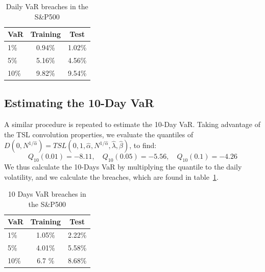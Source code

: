 \documentclass[11pt]{article}
\begin{document}
        \begin{table}[h!]
            \centering
            \begin{tabular}{l|cc}
                  \textbf{VaR}   & \textbf{Training} & \textbf{Test} \\
                  \hline
                  1\%   & 0.94\% & 1.02\% \\
                  5\%   & 5.16\% & 4.56\% \\
                  10\%  & 9.82\% & 9.54\% \\
            \end{tabular}
            \caption{Daily VaR breaches in the S\&P500}
            \label{tab:var_breaches}
        \end{table}

        \subsection{Estimating the 10-Day VaR}
        A similar procedure is repeated to estimate the 10-Day VaR. Taking advantage of the TSL convolution properties, we evaluate the quantiles of $D(0,N^{1/\hat{\alpha}}) = TSL(0,1,\hat \alpha,N^{1/\hat{\alpha}},\hat \lambda,\hat \beta)$, to find:
        $$Q_{10}(0.01) =  -8.11, \quad Q_{10}(0.05) = -5.56, \quad Q_{10}(0.1) = -4.26$$
        We thus calculate the 10-Days VaR by multiplying the quantile to the daily volatility, and we calculate the breaches, which are found in table~\ref{tab:var_breaches}.
        \begin{table}[h!]
            \centering
            \begin{tabular}{l|cc}
                  \textbf{VaR}   & \textbf{Training} & \textbf{Test} \\
                  \hline
                  1\%   & 1.05\% & 2.22\% \\
                  5\%   & 4.01\% & 5.58\% \\
                  10\%  & 6.7 \% & 8.68\% \\
            \end{tabular}
            \caption{10 Days VaR breaches in the S\&P500}
            \label{tab:scaled_var_breaches}
        \end{table}
\end{document}
